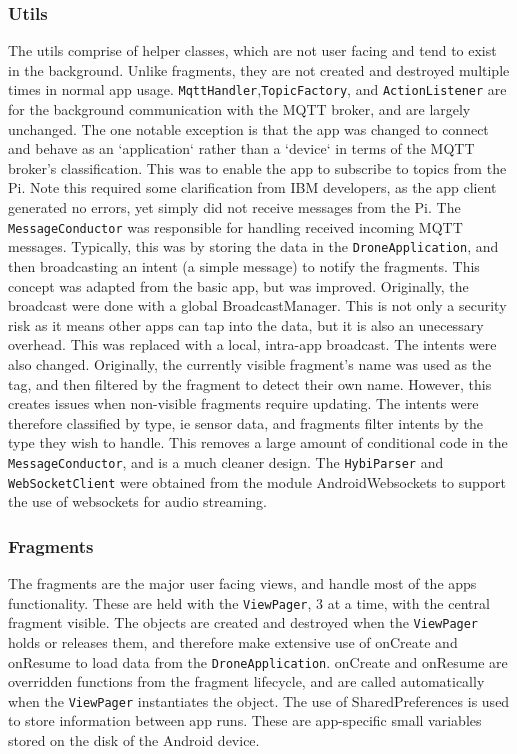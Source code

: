 \documentclass{article}
\begin{document}
\subsubsection{Utils}
The utils comprise of helper classes, which are not user facing and tend to exist in the background. Unlike fragments, they are not created and destroyed multiple times in normal app usage. \texttt{MqttHandler},\texttt{TopicFactory}, and \texttt{ActionListener} are for the background communication with the MQTT broker, and are largely unchanged. The one notable exception is that the app was changed to connect and behave as an `application` rather than a `device` in terms of the MQTT broker's classification. This was to enable the app to subscribe to topics from the Pi. Note this required some clarification from IBM developers, as the app client generated no errors, yet simply did not receive messages from the Pi\cite{githubTopicIssue}. The \texttt{MessageConductor} was responsible for handling received incoming MQTT messages. Typically, this was by storing the data in the \texttt{DroneApplication}, and then broadcasting an intent (a simple message) to notify the fragments. This concept was adapted from the basic app, but was improved. Originally, the broadcast were done with a global BroadcastManager. This is not only a security risk as it means other apps can tap into the data, but it is also an unecessary overhead. This was replaced with a local, intra-app broadcast. The intents were also changed. Originally, the currently visible fragment's name was used as the tag, and then filtered by the fragment to detect their own name. However, this creates issues when non-visible fragments require updating. The intents were therefore classified by type, ie sensor data, and fragments filter intents by the type they wish to handle. This removes a large amount of conditional code in the \texttt{MessageConductor}, and is a much cleaner design. The \texttt{HybiParser} and \texttt{WebSocketClient} were obtained from the module AndroidWebsockets\cite{androidWebsockets} to support the use of websockets for audio streaming.

\subsubsection{Fragments}
The fragments are the major user facing views, and handle most of the apps functionality. These are held with the \texttt{ViewPager}, 3 at a time, with the central fragment visible. The objects are created and destroyed when the \texttt{ViewPager} holds or releases them, and therefore make extensive use of onCreate and onResume to load data from the \texttt{DroneApplication}. onCreate and onResume are overridden functions from the fragment lifecycle, and are called automatically when the \texttt{ViewPager} instantiates the object. The use of SharedPreferences is used to store information between app runs. These are app-specific small variables stored on the disk of the Android device.
\end{document}
